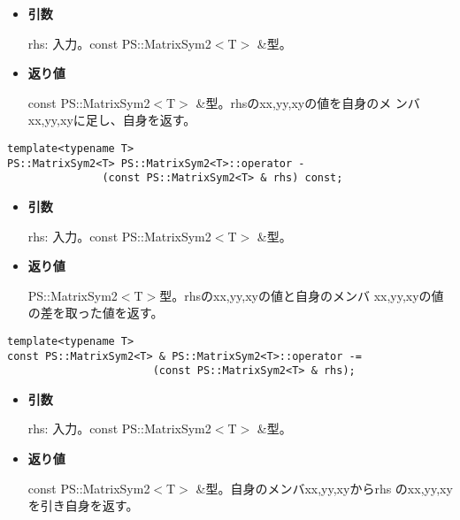\begin{itemize}

\item{{\bf 引数}}

{rhs}: 入力。{const PS::MatrixSym2$<$T$>$ \&}型。

\item{{\bf 返り値}}

{const PS::MatrixSym2$<$T$>$ \&}型。{rhs}のxx,yy,xyの値を自身のメ
ンバxx,yy,xyに足し、自身を返す。

\end{itemize}

\begin{screen}
\begin{verbatim}
template<typename T>
PS::MatrixSym2<T> PS::MatrixSym2<T>::operator - 
               (const PS::MatrixSym2<T> & rhs) const;
\end{verbatim}
\end{screen}

\begin{itemize}

\item{{\bf 引数}}

{rhs}: 入力。{const PS::MatrixSym2$<$T$>$ \&}型。

\item{{\bf 返り値}}

{PS::MatrixSym2$<$T$>$}型。{rhs}のxx,yy,xyの値と自身のメンバ
xx,yy,xyの値の差を取った値を返す。

\end{itemize}

\begin{screen}
\begin{verbatim}
template<typename T>
const PS::MatrixSym2<T> & PS::MatrixSym2<T>::operator -= 
                       (const PS::MatrixSym2<T> & rhs);
\end{verbatim}
\end{screen}

\begin{itemize}

\item{{\bf 引数}}

{rhs}: 入力。{const PS::MatrixSym2$<$T$>$ \&}型。

\item{{\bf 返り値}}

{const PS::MatrixSym2$<$T$>$ \&}型。自身のメンバxx,yy,xyから{rhs}
のxx,yy,xyを引き自身を返す。

\end{itemize}

